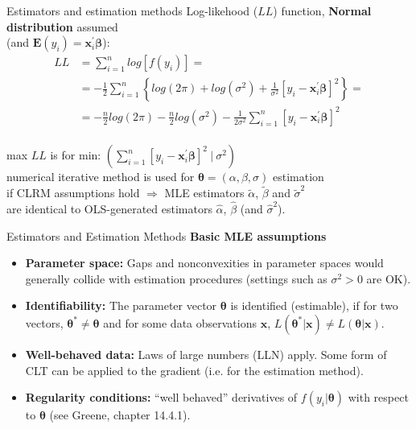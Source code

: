 \documentclass{beamer}
\begin{document}
\begin{frame}{Estimators and estimation methods}
Log-likehood ($LL$) function, \textbf{Normal distribution} assumed\\
(and $\mathbf{E}(y_i)=\bm{x}_i^{\prime}\bm{\beta}$):
\begin{align*}
LL & =\sum_{i=1}^n log[f(y_i)] = \\
& = -\frac{1}{2} \sum_{i=1}^n \left\lbrace { log(2\pi) + log(\sigma^2)+\frac{1}{\sigma^2}[y_i-\bm{x}_i^{\prime}\bm{\beta}]^2} \right\rbrace = \\ 
& = -\frac{n}{2}log(2\pi)-\frac{n}{2}log(\sigma^2)-\frac{1}{2\sigma^2} \sum_{i=1}^n [y_i-\bm{x}_i^{\prime}\bm{\beta}]^2
\end{align*}
\\ \bigskip
max $LL$ is for min: $(\sum_{i=1}^n[y_i-\bm{x}_i^{\prime}\bm{\beta}]^2 ~|~ \sigma^2)$ \\
numerical iterative method is used for $\bm{\theta}=(\alpha, \beta, \sigma)$ estimation\\
if CLRM assumptions hold $\Rightarrow$ MLE estimators $\tilde{\alpha}$, $\tilde{\beta}$ and $\tilde{\sigma}^2$\\ are identical to OLS-generated estimators $\hat{\alpha}$, $\hat{\beta}$ (and $\hat{\sigma}^2$).
\end{frame}
\begin{frame}{Estimators and Estimation Methods}
\textbf{Basic MLE assumptions}\\
\begin{itemize}
    \item \textbf{Parameter space:} Gaps and nonconvexities in parameter spaces would generally collide with estimation procedures (settings such as $\sigma^2 > 0$ are OK).
    \item \textbf{Identifiability:} The parameter vector $\bm{\theta}$ is identified (estimable), if for two vectors, $\bm{\theta}^{*} \neq \bm{\theta}$ and for some data observations $\bm{x}$, $L(\bm{\theta}^{*}|\bm{x}) \neq L(\bm{\theta}|\bm{x})$.
    \item \textbf{Well-behaved data:} Laws of large numbers (LLN) apply. Some form of CLT can be applied to the gradient (i.e. for the estimation method).
    \item \textbf{Regularity conditions:} ``well behaved'' derivatives of $f(y_i|\bm{\theta})$ with respect to $\bm{\theta}$ (see Greene, chapter 14.4.1).
\end{itemize}
\end{frame}
\end{document}
